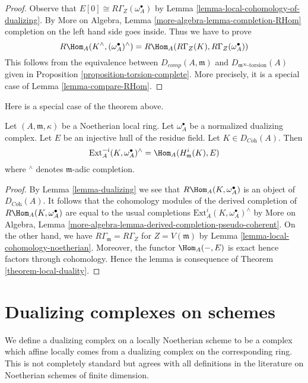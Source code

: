 \begin{proof}
Observe that $E[0] \cong R\Gamma_Z(\omega_A^\bullet)$ by
Lemma \ref{lemma-local-cohomology-of-dualizing}.
By More on Algebra, Lemma \ref{more-algebra-lemma-completion-RHom}
completion on the left hand side goes inside.
Thus we have to prove
$$
R\Hom_A(K^\wedge, (\omega_A^\bullet)^\wedge)
=
R\Hom_A(R\Gamma_Z(K), R\Gamma_Z(\omega_A^\bullet))
$$
This follows from the equivalence between
$D_{comp}(A, \mathfrak m)$ and $D_{\mathfrak m^\infty\text{-torsion}}(A)$
given in Proposition \ref{proposition-torsion-complete}.
More precisely, it is a special case of Lemma \ref{lemma-compare-RHom}.
\end{proof}

\noindent
Here is a special case of the theorem above.

\begin{lemma}
\label{lemma-special-case-local-duality}
Let $(A, \mathfrak m, \kappa)$ be a Noetherian local ring.
Let $\omega_A^\bullet$ be a normalized dualizing complex.
Let $E$ be an injective hull of the residue field.
Let $K \in D_{\textit{Coh}}(A)$. Then
$$
\text{Ext}^{-i}_A(K, \omega_A^\bullet)^\wedge =
\Hom_A(H^i_{\mathfrak m}(K), E)
$$
where ${}^\wedge$ denotes $\mathfrak m$-adic completion.
\end{lemma}

\begin{proof}
By Lemma \ref{lemma-dualizing} we see that $R\Hom_A(K, \omega_A^\bullet)$
is an object of $D_{\textit{Coh}}(A)$.
It follows that the cohomology modules of the derived completion
of $R\Hom_A(K, \omega_A^\bullet)$ are equal to the usual completions
$\text{Ext}^i_A(K, \omega_A^\bullet)^\wedge$ by
More on Algebra, Lemma
\ref{more-algebra-lemma-derived-completion-pseudo-coherent}.
On the other hand, we have $R\Gamma_{\mathfrak m} = R\Gamma_Z$
for $Z = V(\mathfrak m)$ by Lemma \ref{lemma-local-cohomology-noetherian}.
Moreover, the functor $\Hom_A(-, E)$ is exact hence
factors through cohomology.
Hence the lemma is consequence of
Theorem \ref{theorem-local-duality}.
\end{proof}






\section{Dualizing complexes on schemes}
\label{section-dualizing-schemes}

\noindent
We define a dualizing complex on a locally Noetherian scheme
to be a complex which affine locally comes from a dualizing
complex on the corresponding ring. This is not completely
standard but agrees with all definitions in the literature
on Noetherian schemes of finite dimension.

